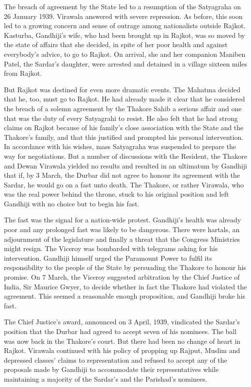 \begin{multicols}{2}
The breach of agreement by the State led to a resumption of the Satyagraha on 26 January 1939. Virawala answered with severe repression. As before, this soon led to a growing concern and sense of outrage among nationalists outside Rajkot. Kasturba, Gandhiji's wife, who had been brought up in Rajkot, was so moved by the state of affairs that she decided, in spite of her poor health and against everybody's advice, to go to Rajkot. On arrival, she and her companion Maniben Patel, the Sardar's daughter, were arrested and detained in a village sixteen miles from Rajkot. 

But Rajkot was destined for even more dramatic events. The Mahatma decided that he, too, must go to Rajkot. He had already made it clear that he considered the breach of a solemn agreement by the Thakore Sahib a serious affair and one that was the duty of every Satyagrahi to resist. He also felt that he had strong claims on Rajkot because of his family's close association with the State and the Thakore's family, and that this justified and prompted his personal intervention. In accordance with his wishes, mass Satyagraha was suspended to prepare the way for negotiations. But a number of discussions with the Resident, the Thakore and Dewan Virawala yielded no results and resulted in an ultimatum by Gandhiji that if, by 3 March, the Durbar did not agree to honour its agreement with the Sardar, he would go on a fast unto death. The Thakore, or rather Virawala, who was the real power behind the throne, stuck to his original position and left Gandhiji with no choice but to begin his fast. 

The fast was the signal for a nation-wide protest. Gandhiji's health was already poor and any prolonged fast was likely to be dangerous. There were hartals, an adjournment of the legislature and finally a threat that the Congress Ministries might resign. The Viceroy was bombarded with telegrams asking for his intervention. Gandhiji himself urged the Paramount Power to fulfil its responsibility to the people of the State by persuading the Thakore to honour his promise. On 7 March, the Viceroy suggested arbitration by the Chief Justice of India, Sir Maurice Gwyer, to decide whether in fact the Thakore had violated the agreement. This seemed a reasonable enough proposition, and Gandhiji broke his fast. 

The Chief Justice's award, announced on 3 April, 1939, vindicated the Sardar's position that the Durbar had agreed to accept seven of his nominees. The ball was now back in the Thakore's court. But there had been no change of heart in Rajkot. Virawala continued with his policy of propping up Rajput, Muslim and depressed classes' claims to representation and refused to accept any of the proposals made by Gandhiji to accommodate their representatives while maintaining a majority of the Sardar's and the Parishad's nominees. 


\end{multicols}
